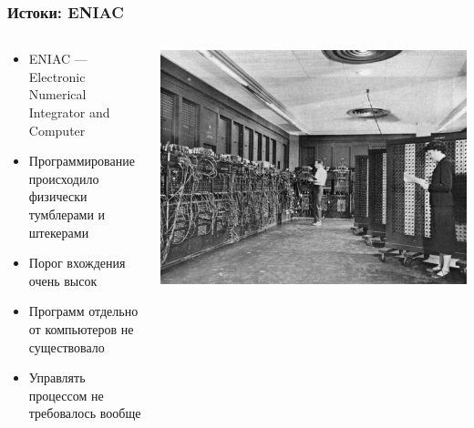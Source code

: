 \documentclass{../../slides-style}
\begin{document}
    \begin{frame}
        \frametitle{Истоки: ENIAC}
        \begin{columns}
            \begin{column}{0.5\textwidth}
                \begin{itemize}
                    \item ENIAC --- Electronic Numerical Integrator and Computer 
                    \item Программирование происходило физически тумблерами и штекерами
                    \item Порог вхождения очень высок
                    \item Программ отдельно от компьютеров не существовало
                    \item Управлять процессом не требовалось вообще                    
                \end{itemize}
            \end{column}
            \begin{column}{0.5\textwidth}
                \begin{center}
                    \includegraphics[width=\textwidth]{eniac.png}
                \end{center}
            \end{column}
        \end{columns}
    \end{frame}
\end{document}

